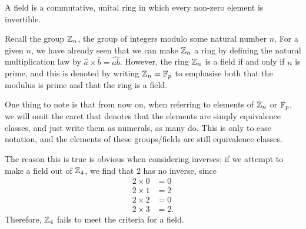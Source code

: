 \begin{definition}
	A field is a commutative, unital ring in which every non-zero element is invertible.
\end{definition}
Recall the group $\zn$, the group of integers modulo some natural number $n$.
For a given $n$, we have already seen that we can make $\zn$ a ring by defining the natural multiplication law by $\widehat{a} \times \widehat{b} = \widehat{ab}$.
However, the ring $\zn$ is a field if and only if $n$ is prime, and this is denoted
by writing $\zn = \fp$ to emphasise both that the modulus is prime and
that the ring is a field.

One thing to note is that from now on, when referring to elements of $\zn$ or $\fp$, we will omit the caret that denotes that the elements are simply equivalence classes, and just write them as numerals, as many do. This is only to ease notation, and the elements of these groups/fields are still equivalence classes.

The reason this is true is obvious when considering inverses; if we attempt to make a field out of $\zn[4]$, we find that $2$ has no inverse, since
\begin{align*}
	2 \times 0 &= 0\\
	2 \times 1 &= 2\\
	2 \times 2 &= 0\\
	2 \times 3 &= 2.
\end{align*}
Therefore, $\zn[4]$ fails to meet the criteria for a field.

